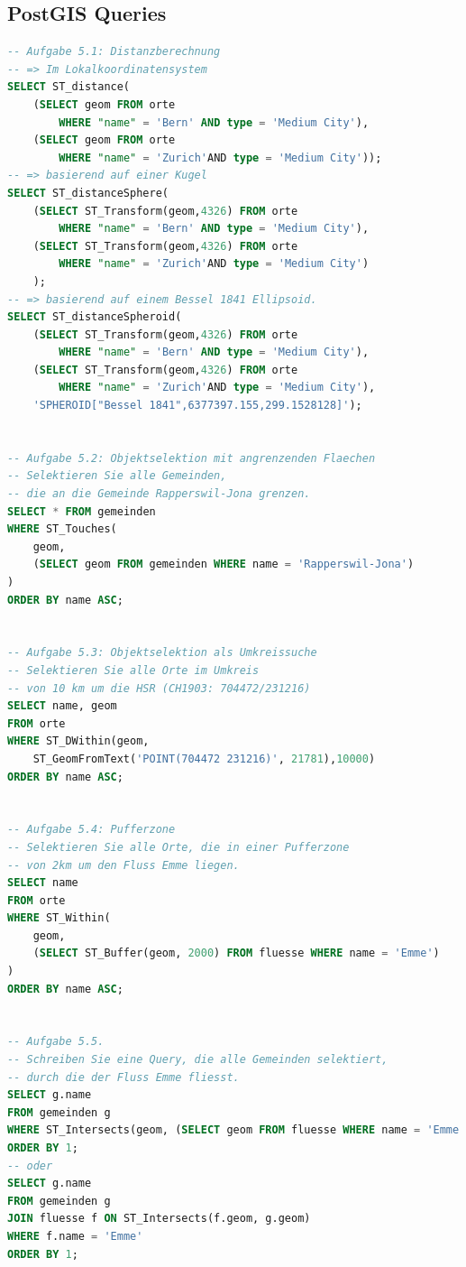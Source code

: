 \documentclass[../Main.tex]{subfiles}
\begin{document}
\subsection{PostGIS Queries}
\begin{lstlisting}[language=SQL]
-- Aufgabe 5.1: Distanzberechnung
-- => Im Lokalkoordinatensystem
SELECT ST_distance(
    (SELECT geom FROM orte 
        WHERE "name" = 'Bern' AND type = 'Medium City'),
    (SELECT geom FROM orte
        WHERE "name" = 'Zurich'AND type = 'Medium City'));
-- => basierend auf einer Kugel
SELECT ST_distanceSphere(
    (SELECT ST_Transform(geom,4326) FROM orte
        WHERE "name" = 'Bern' AND type = 'Medium City'),
    (SELECT ST_Transform(geom,4326) FROM orte
        WHERE "name" = 'Zurich'AND type = 'Medium City')
    );
-- => basierend auf einem Bessel 1841 Ellipsoid.
SELECT ST_distanceSpheroid(
    (SELECT ST_Transform(geom,4326) FROM orte
        WHERE "name" = 'Bern' AND type = 'Medium City'),
    (SELECT ST_Transform(geom,4326) FROM orte
        WHERE "name" = 'Zurich'AND type = 'Medium City'),
    'SPHEROID["Bessel 1841",6377397.155,299.1528128]');


-- Aufgabe 5.2: Objektselektion mit angrenzenden Flaechen
-- Selektieren Sie alle Gemeinden,
-- die an die Gemeinde Rapperswil-Jona grenzen.
SELECT * FROM gemeinden
WHERE ST_Touches(
    geom, 
    (SELECT geom FROM gemeinden WHERE name = 'Rapperswil-Jona')
) 
ORDER BY name ASC;


-- Aufgabe 5.3: Objektselektion als Umkreissuche
-- Selektieren Sie alle Orte im Umkreis
-- von 10 km um die HSR (CH1903: 704472/231216)
SELECT name, geom 
FROM orte
WHERE ST_DWithin(geom, 
    ST_GeomFromText('POINT(704472 231216)', 21781),10000)
ORDER BY name ASC;


-- Aufgabe 5.4: Pufferzone
-- Selektieren Sie alle Orte, die in einer Pufferzone
-- von 2km um den Fluss Emme liegen.
SELECT name 
FROM orte
WHERE ST_Within(
    geom,
    (SELECT ST_Buffer(geom, 2000) FROM fluesse WHERE name = 'Emme')
)
ORDER BY name ASC;


-- Aufgabe 5.5. 
-- Schreiben Sie eine Query, die alle Gemeinden selektiert,
-- durch die der Fluss Emme fliesst. 
SELECT g.name 
FROM gemeinden g
WHERE ST_Intersects(geom, (SELECT geom FROM fluesse WHERE name = 'Emme'))
ORDER BY 1;
-- oder 
SELECT g.name 
FROM gemeinden g
JOIN fluesse f ON ST_Intersects(f.geom, g.geom)
WHERE f.name = 'Emme' 
ORDER BY 1;
    
\end{lstlisting}
\end{document}
